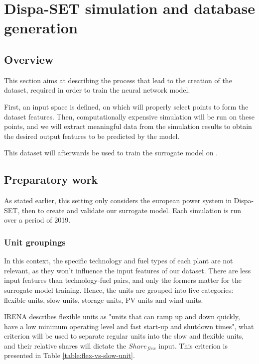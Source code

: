 \section{Dispa-SET simulation and database generation}

\subsection{Overview}

This section aims at describing the process that lead to the creation of the dataset, required in order to train the neural network model.

First, an input space is defined, on which will properly select points to form the dataset features. Then, computationally expensive simulation will be run on these points, and we will extract meaningful data from the simulation results to obtain the desired output features to be predicted by the model.

This dataset will afterwards be used to train the surrogate model on \cite{surrogate_model}.

\subsection{Preparatory work}

As stated earlier, this setting only considers the european power system in Dispa-SET, then to create and validate our surrogate model. Each simulation is run over a period of 2019.

\subsubsection{Unit groupings}
In this context, the specific technology and fuel types of each plant are not relevant, as they won't influence the input features of our dataset. There are less input features than technology-fuel pairs, and only the formers matter for the surrogate model training. Hence, the units are grouped into five categories: flexible units, slow units, storage units, PV units and wind units.

IRENA \cite{irena} describes flexible units as "units that can ramp up and down quickly, have a low minimum operating level and fast start-up and shutdown times", what criterion will be used to separate regular units into the slow and flexible units, and their relative shares will dictate the $Share_{flex}$ input. This criterion is presented in Table \ref{table:flex-vs-slow-unit}.

